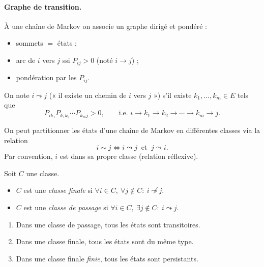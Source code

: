 \paragraph{Graphe de transition.}
À une chaîne de Markov on associe un graphe dirigé et pondéré :
\begin{itemize}
  \item sommets $=$ états ;
  \item arc de $i$ vers $j$ ssi $P_{ij} > 0$ (noté $i \to j$) ;
  \item pondération par les $P_{ij}$.
\end{itemize}

\begin{definition}
On note $i \leadsto j$ (« il existe un chemin de $i$ vers $j$ ») s'il existe $k_1, \dots, k_m \in E$ tels que
\[
P_{ik_1} P_{k_1 k_2} \cdots P_{k_m j} > 0, \qquad
\text{i.e. } i \to k_1 \to k_2 \to \cdots \to k_m \to j .
\]
\end{definition}

On peut partitionner les états d'une chaîne de Markov en différentes classes via la relation
\[
i \sim j \iff i \leadsto j \ \text{ et } \ j \leadsto i .
\]
Par convention, $i$ est dans sa propre classe (relation réflexive).

\begin{definition}
Soit $C$ une classe.
\begin{itemize}
  \item $C$ est une \emph{classe finale} si
  $\forall i \in C,\ \forall j \notin C : \ i \not\leadsto j$.
  \item $C$ est une \emph{classe de passage} si
  $\forall i \in C,\ \exists j \notin C : \ i \leadsto j$.
\end{itemize}
\end{definition}

\begin{proposition}\label{prop:classes}
\begin{enumerate}
  \item[(i)] Dans une classe de passage, tous les états sont transitoires.
  \item[(ii)] Dans une classe finale, tous les états sont du même type.
  \item[(iii)] Dans une classe finale \emph{finie}, tous les états sont persistants.
\end{enumerate}
\end{proposition}

